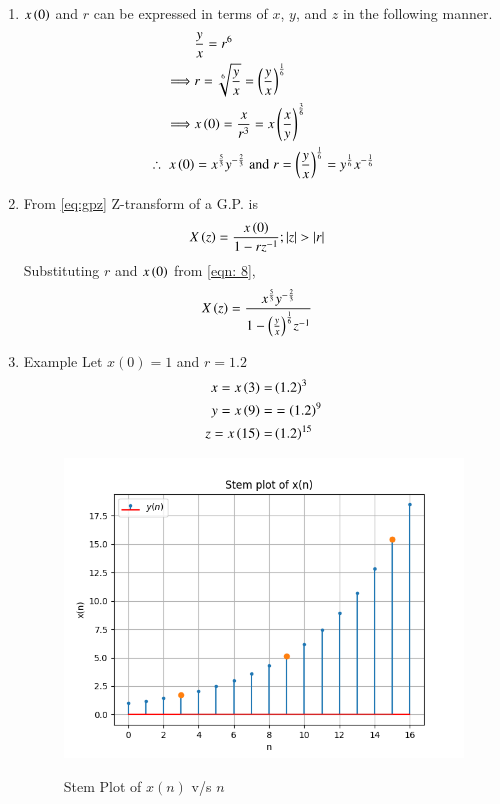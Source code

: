 \documentclass[journal,12pt,twocolumn]{IEEEtran}
\theoremstyle{remark}
\begin{document}
\begin{enumerate}
\item
$x\left(0\right)$ and $r$ can be expressed in terms of $x$, $y$, and $z$ in the following manner.
\begin{align}
    &\frac{y}{x}=r^6 \\
	\implies& r=\sqrt[6]{\frac{y}{x}}=\left(\frac{y}{x}\right)^{\frac{1}{6}}\\
    \implies& x\left(0\right)=\frac{x}{r^3} =x\left(\frac{x}{y}\right)^{\frac{3}{6}}\\
	\therefore\; x\left(0\right)&=x^{\frac{5}{3}}y^{-\frac{2}{3}}\;
	\text{and}\; r=\left(\frac{y}{x}\right)^{\frac{1}{6}}= y^{\frac{1}{6}}x^{-\frac{1}{6}} \label{eqn: 8}
\end{align}
\item 
From \eqref{eq:gpz} Z-transform of a G.P. is
\begin{align}
    X\left(z\right)&=\frac{x\left(0\right)}{1-rz^{-1}}; \left\vert z\right\vert>\left\vert r\right\vert
\end{align}
Substituting $r$ and $x\left(0\right)$ from \eqref{eqn: 8}, 
\begin{align}
     X\left(z\right)&=\frac{x^{\frac{5}{3}}y^{-\frac{2}{3}}}{1-{\left(\frac{y}{x}\right)^{\frac{1}{6}}}z^{-1}}
\end{align}
\item Example 
Let $x(0)=1$ and $r=1.2$
\begin{align}
    x=x\left(3\right)=& \left(1.2\right)^3 \\
    y=x\left(9\right)=&=\left(1.2\right)^9\\
    z=x\left(15\right)=&\left(1.2\right)^{15}
\end{align}
\begin{figure}[h]
    \renewcommand\thefigure{1}
    \centering
    \caption{Stem Plot of $x(n)$ v/s $n$}
    \includegraphics[width=\columnwidth]{figs/A_1.png}
        \label{fig:1}
\end{figure}


\end{enumerate}
\end{document}
